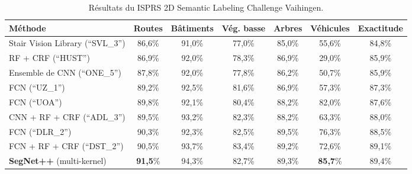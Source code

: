 \begin{table}[t]
  \centering
  \caption{Résultats du ISPRS 2D Semantic Labeling Challenge Vaihingen.}
  \begin{tabularx}{\textwidth}{ Y c c c c c c }
  \toprule
  Méthode & Routes & Bâtiments & Vég. basse & Arbres & Véhicules & Exactitude\\
  \midrule
  Stair Vision Library {\scriptsize (``SVL\_3'')}\cite{gerke_use_2015} & 86,6\% &	91,0\% &	77,0\% &	85,0\%	& 55,6\% &	84,8\% \\
  RF + CRF {\scriptsize (``HUST'')}\cite{quang_efficient_2015} & 86,9\% & 92,0\% &	78,3\% &	86,9\% &	29,0\% &	85,9\% \\
  Ensemble de CNN {\scriptsize (``ONE\_5'')}\cite{boulch_dag_2015} & 87,8\% &	92,0\% &	77,8\% &	86,2\% &	50,7\% &	85,9\% \\
  FCN {\scriptsize (``UZ\_1'')}\cite{volpi_dense_2017} & 89,2\% &	92,5\% &	81,6\% &	86,9\% &	57,3\% &	87,3\% \\
  FCN {\scriptsize (``UOA'')}\cite{lin_efficient_2015} & 89,8\% &	92,1\% &	80,4\% &	88,2\% &	82,0\% &	87,6\% \\
  CNN + RF + CRF {\scriptsize (``ADL\_3'')}\cite{paisitkriangkrai_effective_2015} & 89,5\% &	93,2\% &	82,3\% &	88,2\% &	63,3\% &	88,0\% \\
  FCN {\scriptsize (``DLR\_2'')}\cite{marmanis_semantic_2016} & 90,3\% &	92,3\% &	82,5\% &	89,5\% &	76,3\% &	88,5\% \\
  FCN + RF + CRF {\scriptsize (``DST\_2'')}\cite{sherrah_fully_2016} & 90,5\% &	93,7\% &	83,4\% &	89,2\% &	72,6\% &	89,1\% \\
  \midrule
  \textbf{SegNet++} (multi-kernel)\cite{audebert_semantic_2016} & \textbf{91,5}\% &	94,3\% &	82,7\% &	89,3\% &	\textbf{85,7}\% &	89,4\% \\
  \bottomrule
  \end{tabularx}
  \label{tab:final_vaihingen}
\end{table}

